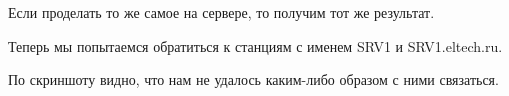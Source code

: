 \documentclass[a4paper,12pt]{article}
\begin{document}
Если проделать то же самое на сервере, то получим тот же результат.
\begin{figure}[H]
\end{figure}

Теперь мы попытаемся обратиться к станциям с именем SRV1 и SRV1.eltech.ru.

\begin{figure}[H]
\end{figure}

По скриншоту видно, что нам не удалось каким-либо образом с ними связаться. 
\end{document}
